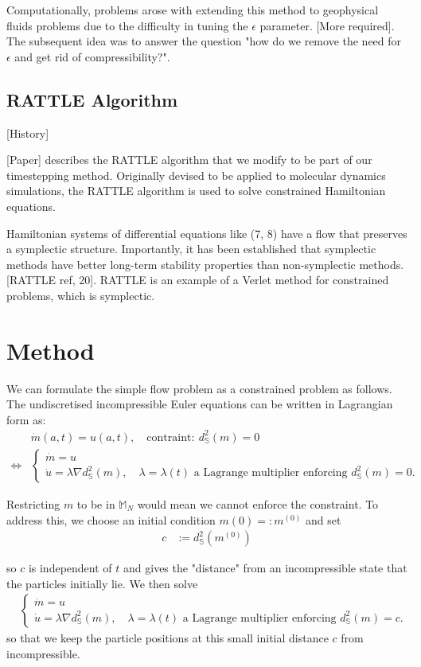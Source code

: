 \documentclass[11pt, oneside]{article}   	%
\newcommand{\MN}{\mathbb{M}_N}
\newcommand{\dsmsq}{d^{2}_{\mathbb{S}}(m)}
\newcommand{\graddsmsq}{\nabla{d^{2}_{\mathbb{S}}(m)}}
\begin{document}
Computationally, problems arose with extending this method to geophysical fluids problems due to the difficulty in tuning the \(\epsilon\) parameter. [More required]. The subsequent idea was to answer the question "how do we remove the need for \(\epsilon\) and get rid of compressibility?".

\subsection{RATTLE Algorithm}

[History]

[Paper] describes the RATTLE algorithm that we modify to be part of our timestepping method. Originally devised to be applied to molecular dynamics simulations, the RATTLE algorithm is used to solve constrained Hamiltonian equations. 

Hamiltonian systems of differential equations like (7, 8) have a flow that preserves a symplectic structure. Importantly, it has been established that symplectic methods have better long-term stability properties than non-symplectic methods. [RATTLE ref, 20]. RATTLE is an example of a Verlet method for constrained problems, which is symplectic.


\section{Method}

We can formulate the simple flow problem as a constrained problem as follows. The undiscretised incompressible Euler equations can be written in Lagrangian form as:
\begin{align}
& \dot{m}(a, t) = u(a,t), \quad \text{contraint}: \: \dsmsq = 0 \\
\iff
 &\begin{cases}
  \dot{m} = u \\
  \dot{u} = \lambda \graddsmsq, \quad \lambda = \lambda(t) \text{ a Lagrange multiplier enforcing } \dsmsq = 0.
 \end{cases} 
\end{align}

Restricting \(m\) to be in \(\MN\) would mean we cannot enforce the constraint. To address this, we choose an initial condition \(m(0) =: m^{(0)}\) and set
\begin{align}
c &:= d^{2}_{\mathbb{S}}(m^{(0)})
\end{align}

so \(c\) is independent of \(t\) and gives the "distance" from an incompressible state that the particles initially lie. We then solve
\begin{align}
 &\begin{cases}
  \dot{m} = u \\
  \dot{u} = \lambda \graddsmsq, \quad \lambda = \lambda(t) \text{ a Lagrange multiplier enforcing } \dsmsq = c.
 \end{cases} 
\end{align}
so that we keep the particle positions at this small initial distance \(c\) from incompressible.
\end{document}
